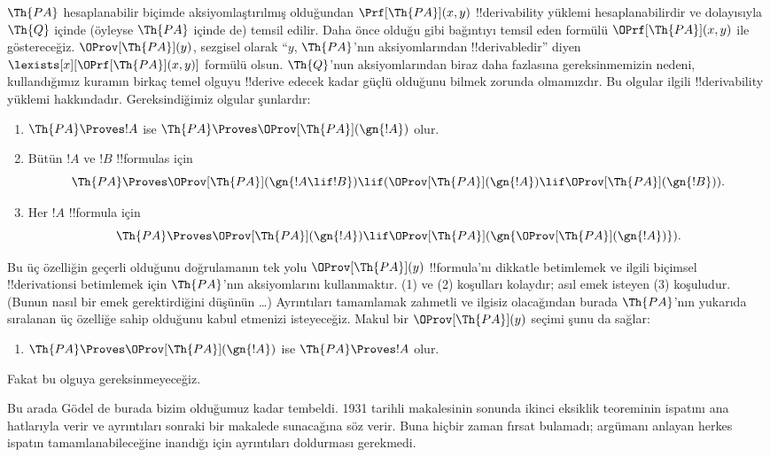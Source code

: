$\Th{PA}$ hesaplanabilir biçimde aksiyomlaştırılmış olduğundan
$\Prf[\Th{PA}](x,y)$ !!{derivability} yüklemi hesaplanabilirdir ve dolayısıyla
$\Th{Q}$ içinde (öyleyse $\Th{PA}$ içinde de) temsil edilir. Daha önce olduğu
gibi bağıntıyı temsil eden formülü $\OPrf[\Th{PA}](x,y)$ ile göstereceğiz.
$\OProv[\Th{PA}](y)$, sezgisel olarak ``$y$, $\Th{PA}$'nın aksiyomlarından
!!{derivable}{}dir'' diyen $\lexists[x][\OPrf[\Th{PA}](x,y)]$ formülü olsun.
$\Th{Q}$'nun aksiyomlarından biraz daha fazlasına gereksinmemizin nedeni,
kullandığımız kuramın birkaç temel olguyu !!{derive} edecek kadar güçlü
olduğunu bilmek zorunda olmamızdır. Bu olgular ilgili !!{derivability}
yüklemi hakkındadır.
Gereksindiğimiz olgular şunlardır:
\begin{enumerate}
\item[P1.] $\Th{PA} \Proves !A$ ise $\Th{PA} \Proves
  \OProv[\Th{PA}](\gn{!A})$ olur.
\item[P2.] Bütün $!A$ ve $!B$ !!{formula}s için
  \[
  \Th{PA} \Proves \OProv[\Th{PA}](\gn{!A \lif !B}) \lif
  (\OProv[\Th{PA}](\gn{!A}) \lif \OProv[\Th{PA}](\gn{!B})).
  \]
\item[P3.] Her $!A$ !!{formula} için
  \[
  \Th{PA} \Proves \OProv[\Th{PA}](\gn{!A})
  \lif \OProv[\Th{PA}](\gn{\OProv[\Th{PA}](\gn{!A})}).
  \]
\end{enumerate}
Bu üç özelliğin geçerli olduğunu doğrulamanın tek yolu
$\OProv[\Th{PA}](y)$ !!{formula}'nı dikkatle betimlemek ve ilgili biçimsel
!!{derivation}s{}i betimlemek için $\Th{PA}$'nın aksiyomlarını kullanmaktır.
(1) ve (2) koşulları kolaydır; asıl emek isteyen (3) koşuludur. (Bunun nasıl
bir emek gerektirdiğini düşünün \dots) Ayrıntıları tamamlamak zahmetli ve
ilgisiz olacağından burada $\Th{PA}$'nın yukarıda sıralanan üç özelliğe sahip
olduğunu kabul etmenizi isteyeceğiz. Makul bir $\OProv[\Th{PA}](y)$ seçimi
şunu da sağlar:
\begin{enumerate}
\item[P4.] $\Th{PA} \Proves \OProv[\Th{PA}](\gn{!A})$ ise
  $\Th{PA} \Proves !A$ olur.
\end{enumerate}
Fakat bu olguya gereksinmeyeceğiz.

\begin{digress}
Bu arada G\"odel de burada bizim olduğumuz kadar tembeldi. 1931 tarihli
makalesinin sonunda ikinci eksiklik teoreminin ispatını ana hatlarıyla verir
ve ayrıntıları sonraki bir makalede sunacağına söz verir. Buna hiçbir zaman
fırsat bulamadı; argümanı anlayan herkes ispatın tamamlanabileceğine inandığı
için ayrıntıları doldurması gerekmedi.
\end{digress}

